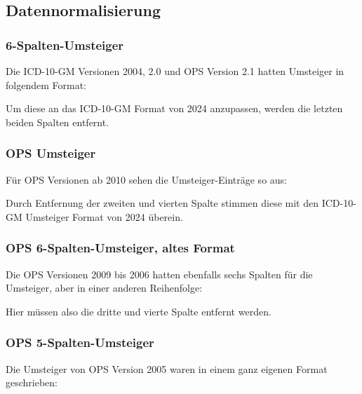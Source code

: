 \subsection{Datennormalisierung}

\subsubsection{6-Spalten-Umsteiger}

Die ICD-10-GM Versionen 2004, 2.0 und OPS Version 2.1 hatten Umsteiger in folgendem Format:


Um diese an das ICD-10-GM Format von 2024 anzupassen, werden die letzten beiden Spalten entfernt. 

\subsubsection{OPS Umsteiger}

Für OPS Versionen ab 2010 sehen die Umsteiger-Einträge so aus:


Durch Entfernung der zweiten und vierten Spalte stimmen diese mit den ICD-10-GM Umsteiger Format von 2024 überein. 

\subsubsection{OPS 6-Spalten-Umsteiger, altes Format}

Die OPS Versionen 2009 bis 2006 hatten ebenfalls sechs Spalten für die Umsteiger, aber in einer anderen Reihenfolge:


Hier müssen also die dritte und vierte Spalte entfernt werden. 

\subsubsection{OPS 5-Spalten-Umsteiger}

Die Umsteiger von OPS Version 2005 waren in einem ganz eigenen Format geschrieben:


